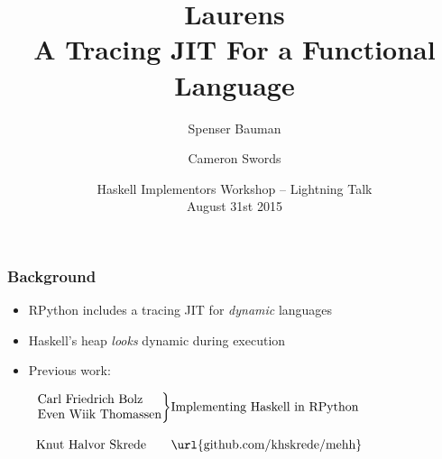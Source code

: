 \documentclass[xetex,serif,mathserif]{beamer}
\title{Laurens \\ {\normalsize A Tracing JIT For a Functional Language} }
\author[shortname]{Spenser Bauman \and Cameron Swords}
\institute[shortinst]{
    Indiana University Bloomington, USA
}
\date{Haskell Implementors Workshop -- Lightning Talk\\ August 31st 2015}
\newenvironment{slide}[1]{\begin{frame}\frametitle{#1}}{\end{frame}}
\begin{document}
\frame{\titlepage}

\begin{slide}{Background}
  \begin{itemize}
    \item RPython includes a tracing JIT for \emph{dynamic} languages
    \item Haskell's heap \emph{looks} dynamic during execution
    \item Previous work:

            \vspace*{1em}
            $\begin{array}{l@{}l}\left. \begin{array}{@{}l@{}}
            \text{Carl Friedrich Bolz} \\
            \text{Even Wiik Thomassen}\\
            \end{array} \right\}  & \text{Implementing Haskell in RPython}\\\\
            \text{Knut Halvor Skrede} &  \text{\url{github.com/khskrede/mehh}}
            \end{array}$
  \end{itemize}
\end{slide}
\end{document}
